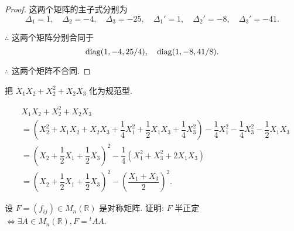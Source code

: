 \documentclass[color=black,device=normal,lang=cn,mode=geye]{elegantnote}
\begin{document}
\begin{proof}
    这两个矩阵的主子式分别为
    \[\Delta_1=1,\quad\Delta_2=-4,\quad\Delta_3=-25,\quad\Delta_1'=1,\quad\Delta_2'=-8,\quad\Delta_3'=-41.\]

    $\therefore$ 这两个矩阵分别合同于
    \[\operatorname{diag}(1,-4,25/4),\quad\operatorname{diag}(1,-8,41/8).\]

    $\therefore$ 这两个矩阵不合同.
\end{proof}
\begin{exercisec}
    把 $X_1X_2+X_2^2+X_2X_3$ 化为规范型.
\end{exercisec}
\begin{solution}
    \begin{align*}
        & X_1X_2+X_2^2+X_2X_3 \\
        & =\left(X_2^2+X_1X_2+X_2X_3+\dfrac{1}{4}X_1^2+\dfrac{1}{2}X_1X_3+\dfrac{1}{4}X_3^2\right)-\dfrac{1}{4}X_1^2-\dfrac{1}{4}X_3^2-\dfrac{1}{2}X_1X_3 \\
        & =\left(X_2+\dfrac{1}{2}X_1+\dfrac{1}{2}X_3\right)^2-\dfrac{1}{4}(X_1^2+X_3^2+2X_1X_3) \\
        & =\left(X_2+\dfrac{1}{2}X_1+\dfrac{1}{2}X_3\right)^2-\left(\dfrac{X_1+X_3}{2}\right)^2.
    \end{align*}
\end{solution}
\begin{exercisec}\label{exc26}
    设 $F=(f_{ij})\in M_n(\mathbb{R})$ 是对称矩阵. 证明: $F$ 半正定 $\Leftrightarrow\exists A\in M_n(\mathbb{R}),F={}^tAA$.
\end{exercisec}
\end{document}
